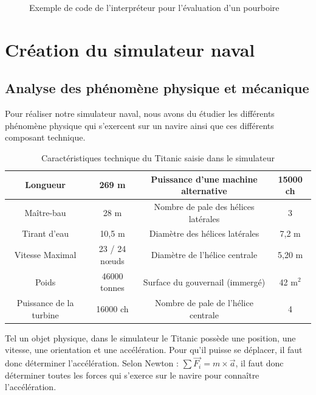 \documentclass[a4paper,11pt]{article}
\begin{document}
    \begin{figure}[H]
        \begin{center}
            \caption{Exemple de code de l’interpréteur pour l’évaluation d'un pourboire}
            
            \label{fig:codeExemple}
        \end{center}
    \end{figure}

    \section{Création du simulateur naval}

    \subsection{Analyse des phénomène physique et mécanique}

    Pour réaliser notre simulateur naval, nous avons du étudier les différents phénomène physique qui s'exercent sur un navire ainsi que ces différents composant technique.

    \begin{table}[H]
        \caption{Caractéristiques technique du Titanic saisie dans le simulateur}
        \label{tab:TitanicData}

        \begin{center}
            \begin{tabular}{|c|c||c|c|}
                \hline
                Longueur & 269 m & Puissance d'une machine alternative & 15000 ch \tabularnewline
                \hline
                Maître-bau & 28 m & Nombre de pale des hélices latérales & 3 \tabularnewline
                \hline
                Tirant d'eau & 10,5 m & Diamètre des hélices latérales & 7,2 m \tabularnewline
                \hline
                Vitesse Maximal & 23 / 24 nœuds & Diamètre de l'hélice centrale & 5,20 m \tabularnewline
                \hline
                Poids & 46000 tonnes & Surface du gouvernail (immergé) & 42 m$^{2}$ \tabularnewline
                \hline
                Puissance de la turbine & 16000 ch & Nombre de pale de l'hélice centrale & 4 \tabularnewline
                \hline
            \end{tabular}
        \end{center}
    \end{table}

    Tel un objet physique, dans le simulateur le Titanic possède une position, une vitesse, une orientation et une accélération. Pour qu'il puisse se déplacer, il faut donc déterminer l'accélération. Selon Newton : $\sum \overrightarrow{F_{i}} = m \times \overrightarrow{a}$, il faut donc déterminer toutes les forces qui s'exerce sur le navire pour connaître l’accélération.
\end{document}

